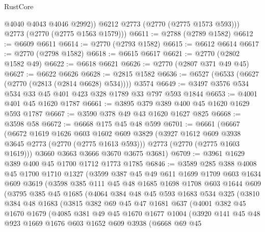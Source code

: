 \begin{lexlean}{RustCore}
\begin{coremodule}
            @4040
            @4043
            @4046
            @2992))
        @6212
        @2773
        (@2770 (@2775 @1573 @593)))
      @2773
      (@2770 (@2775 @1563 @1579)))
@6611 := @2788 (@2789 @1582)
@6612 := @6609 @6611
@6614 := @2770 (@2793 @1582)
@6615 := @6612 @6614
@6617 := @2770 (@2798 @1582)
@6618 := @6615 @6617
@6621 := @2770 (@2802 @1582 @49)
@6622 := @6618 @6621
@6626 := @2770 (@2807 @371 @49 @45)
@6627 := @6622 @6626
@6628 := @2815 @1582
@6636 := @6527 (@6533 (@6627 (@2770 (@2813 (@2814 @6628) @534)))) @3574
@6649 := @3497 @3576 @534 @534 @33 @45 @401 @423 @328 @1789 @33 @797 @593 @1844
@6653 := @4001 @401 @45 @1620 @1787
@6661 := @3895 @379 @389 @400 @45 @1620 @1629 @593 @1787
@6667 := @3590 @378 @49 @43 @1620 @1627 @825
@6668 := @3598 @58
@6672 := @6668 @175 @45 @48 @599
@6701 := @6661
    (@6667
      (@6672
        @1619
        @1626
        @603
        @1602
        @609
        @3829
        (@3927 @1612 @609 @3938 @3645 @2773 (@2770 (@2775 @1613 @593)))
        @2773
        (@2770 (@2775 @1603 @1619)))
      @3660
      @3663
      @3666
      @3670
      @3675
      @3681)
@6709 := @3961 @1629 @389 @400 @45 @1700 @1712 @1773 @1785
@6846 := @3589
    @285
    @388
    @4008
    @45
    @1700
    @1710
    @1327
    (@3599
      @387
      @45
      @49
      @611
      @1699
      @1709
      @603
      @1634
      @609
      @3619
      (@3598
        @385
        @111
        @45
        @48
        @1685
        @1698
        @1708
        @603
        @1644
        @609
        (@3795
          @385
          @45
          @1685
          (@4064
            @384
            @48
            @45
            @593
            @1683
            @534
            @325
            (@3810
              @384
              @48
              @1683
              (@3815
                @382
                @69
                @45
                @47
                @1681
                @637
                (@4001
                  @382
                  @45
                  @1670
                  @1679
                  (@4085
                    @381
                    @49
                    @45
                    @1670
                    @1677
                    @1004
                    (@3920
                      @141
                      @45
                      @48
                      @923
                      @1669
                      @1676
                      @603
                      @1652
                      @609
                      @3938
                      (@6668
                        @69
                        @45

\end{coremodule}
\end{lexlean}
